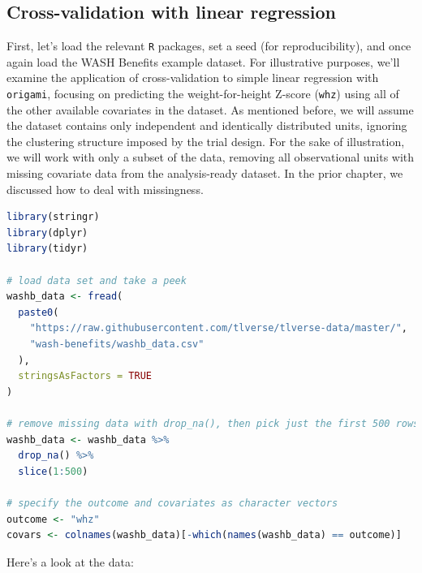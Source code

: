 \documentclass[
  12pt, krantz2,
]{krantz}
\newcommand{\passthrough}[1]{#1}
\newcommand{\1}{\mathbbm{1}}
\theoremstyle{definition}
\theoremstyle{definition}
\theoremstyle{definition}
\theoremstyle{definition}
\theoremstyle{remark}
\begin{document}
\hypertarget{cross-validation-with-linear-regression}{%
\subsection{Cross-validation with linear regression}\label{cross-validation-with-linear-regression}}

First, let's load the relevant \passthrough{\lstinline!R!} packages, set a seed (for reproducibility),
and once again load the WASH Benefits example dataset. For illustrative
purposes, we'll examine the application of cross-validation to simple linear
regression with \passthrough{\lstinline!origami!}, focusing on predicting the weight-for-height Z-score
(\passthrough{\lstinline!whz!}) using all of the other available covariates in the dataset. As mentioned
before, we will assume the dataset contains only independent and identically
distributed units, ignoring the clustering structure imposed by the trial
design. For the sake of illustration, we will work with only a subset of the
data, removing all observational units with missing covariate data from the
analysis-ready dataset. In the prior chapter, we discussed how to deal with
missingness.

\begin{lstlisting}[language=R]
library(stringr)
library(dplyr)
library(tidyr)

# load data set and take a peek
washb_data <- fread(
  paste0(
    "https://raw.githubusercontent.com/tlverse/tlverse-data/master/",
    "wash-benefits/washb_data.csv"
  ),
  stringsAsFactors = TRUE
)

# remove missing data with drop_na(), then pick just the first 500 rows
washb_data <- washb_data %>%
  drop_na() %>%
  slice(1:500)

# specify the outcome and covariates as character vectors
outcome <- "whz"
covars <- colnames(washb_data)[-which(names(washb_data) == outcome)]
\end{lstlisting}

Here's a look at the data:
\end{document}
